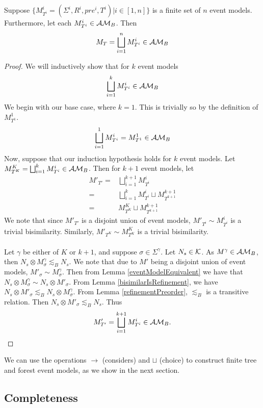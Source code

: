 \begin{lemma} \label{brestrictDisjoint}
Suppose $\{ M^i_{T^i} = (\Sigma^i, R^i, pre^i, T^i) | i \in [1, n] \}$ is a finite set of $n$ event
models.
Furthermore, let each $M^i_{T^i} \in \mathcal{AM}_B$.
Then
\[
	M_T = \bigsqcup_{i = 1}^{n} M^i_{T^i} \in \mathcal{AM}_B
\]
\end{lemma}

\begin{proof}
We will inductively show that for $k$ event models
\[
	\bigsqcup_{i = 1}^k M^i_{T^i} \in \mathcal{AM}_B
\]
We begin with our base case, where $k = 1$.
This is trivially so by the definition of $M^1_{T^1}$.
\[
	\bigsqcup_{i = 1}^1 M^i_{T^i} = M^1_{T^1} \in \mathcal{AM}_B
\]
Now, suppose that our induction hypothesis holds for $k$ event models.
Let $M^K_{T^K} = \bigsqcup_{i = 1}^k M^i_{T^i} \in \mathcal{AM}_B$.
Then for $k+1$ event models, let
\begin{align*}
	M'_{T'} = & \bigsqcup_{i = 1}^{k+1} M^i_{T^i} \\
	= & \bigsqcup_{i = 1}^k M^i_{T^i} \sqcup M^{k+1}_{T^{k+1}} \\
	= & M^K_{T^K} \sqcup M^{k+1}_{T^{k+1}}
\end{align*}
We note that since $M'_{T'}$ is a disjoint union of event models, $M'_{T^i} \sim M^i_{T^i}$ is a
trivial bisimilarity.
Similarly, $M'_{T^K} \sim M^K_{T^K}$ is a trivial bisimilarity.\\
\\
Let $\gamma$ be either of $K$ or $k+1$, and suppose $\sigma \in \Sigma^\gamma$.
Let $N_s \in \mathcal{K}$.
As $M^\gamma \in \mathcal{AM}_B$, then $N_s \otimes M^\gamma_\sigma \lesssim_B N_s$.
We note that due to $M'$ being a disjoint union of event models, $M'_\sigma \sim M^\gamma_\sigma$.
Then from Lemma \ref{eventModelEquivalent} we have that $N_s \otimes M^\gamma_\sigma \sim N_s
\otimes M'_\sigma$.
From Lemma \ref{bisimilarIsRefinement}, we have $N_s \otimes M'_\sigma \lesssim_B N_s \otimes M^\gamma_\sigma$.
From Lemma \ref{refinementPreorder}, $\lesssim_B$ is a transitive relation.
Then $N_s \otimes M'_\sigma \lesssim_B N_s$.
Thus
\[
M'_{T'} = \bigsqcup_{i = 1}^{k+1} M^i_{T^i} \in \mathcal{AM}_B.
\]
\end{proof}

We can use the operations $\to$ (considers) and $\sqcup$ (choice) to construct finite tree and
forest event models, as we show in the next section.

\subsection{Completeness}

